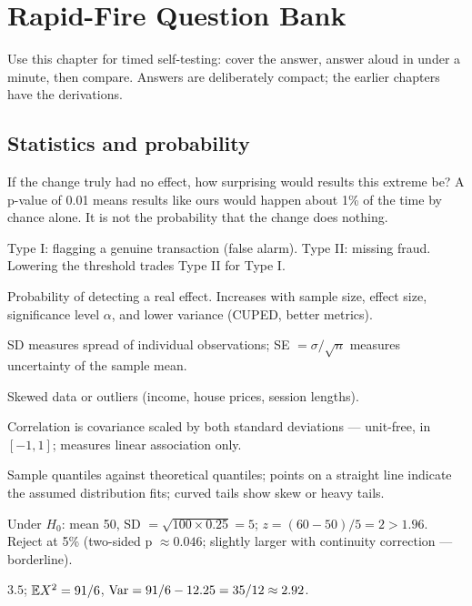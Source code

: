 \chapter{Rapid-Fire Question Bank}

Use this chapter for timed self-testing: cover the answer, answer aloud in under a minute, then compare. Answers are deliberately compact; the earlier chapters have the derivations.

\section{Statistics and probability}
\A If the change truly had no effect, how surprising would results this extreme be? A p-value of 0.01 means results like ours would happen about 1\% of the time by chance alone. It is not the probability that the change does nothing.

\A Type I: flagging a genuine transaction (false alarm). Type II: missing fraud. Lowering the threshold trades Type II for Type I.

\A Probability of detecting a real effect. Increases with sample size, effect size, significance level $\alpha$, and lower variance (CUPED, better metrics).

\A SD measures spread of individual observations; SE $=\sigma/\sqrt n$ measures uncertainty of the sample mean.

\A Skewed data or outliers (income, house prices, session lengths).

\A Correlation is covariance scaled by both standard deviations --- unit-free, in $[-1,1]$; measures linear association only.

\A Sample quantiles against theoretical quantiles; points on a straight line indicate the assumed distribution fits; curved tails show skew or heavy tails.

\A Under $H_0$: mean 50, SD $=\sqrt{100\times0.25}=5$; $z=(60-50)/5=2>1.96$. Reject at 5\% (two-sided p $\approx0.046$; slightly larger with continuity correction --- borderline).

\A $3.5$; $\mathbb{E} X^2=91/6$, $\operatorname{Var}=91/6-12.25=35/12\approx2.92$.

